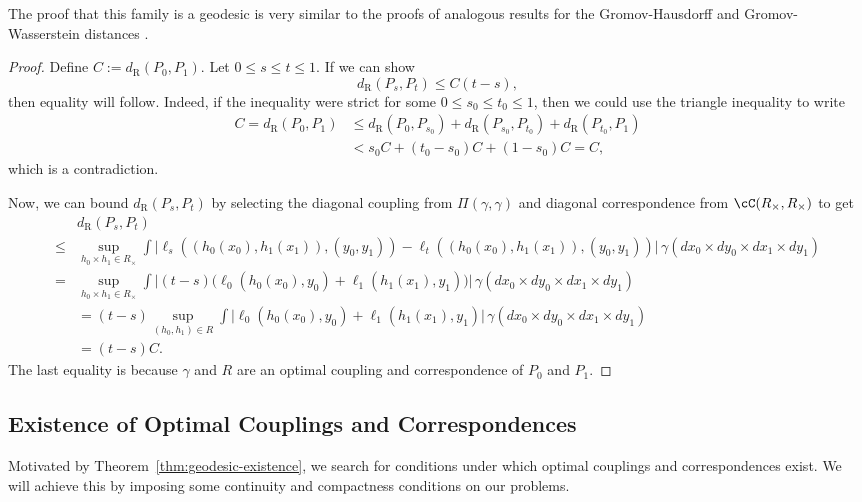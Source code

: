 \documentclass[twoside,11pt]{article}
\newcommand{\dexp}[1][]{d_{\mathrm{R}#1}}
\begin{document}
    The proof that this family is a geodesic is very similar to the proofs of analogous results for the Gromov-Hausdorff and Gromov-Wasserstein distances \citep{chowdhury_explicit_2018,sturm_space_2012}.
    \begin{proof}
        Define $C:= \dexp(P_0,P_1)$. Let $0\leq s\leq t \leq 1$. If we can show
        \[\dexp(P_s,P_t) \leq C(t-s),\]
        then equality will follow. Indeed, if the inequality were strict for some $0\leq s_0 \leq t_0 \leq 1$, then we could use the triangle inequality to write
        \begin{align*}
            C = \dexp(P_0,P_1)
            & \leq 
            \dexp(P_0,P_{s_0}) + \dexp(P_{s_0},P_{t_0}) + \dexp(P_{t_0},P_1)
            \\ & <
            s_0 C + (t_0 - s_0) C + (1-s_0)C = C,
        \end{align*}
        which is a contradiction.

        Now, we can bound $\dexp(P_s,P_t)$ by selecting the diagonal coupling from $\Pi(\gamma,\gamma)$ and diagonal correspondence from $\cC(R_\times,R_\times)$ to get
        \begin{align*}
            & \dexp(P_s,P_t)\\
            \leq &
            \sup_{h_0\times h_1 \in R_\times}
            \int \big| \ell_s((h_0(x_0),h_1(x_1)), (y_0,y_1)) - \ell_t((h_0(x_0),h_1(x_1)), (y_0,y_1))\big | \, \gamma(dx_0{\times} dy_0 {\times} dx_1 {\times}  dy_1)
            \\ = &
            \sup_{h_0\times h_1 \in R_\times}
            \int \big| (t-s)  \big(\ell_0(h_0(x_0),y_0) + \ell_1(h_1(x_1),y_1) \big )\big | \, \gamma(dx_0{\times} dy_0 {\times} dx_1 {\times}  dy_1)
            \\ &
            = (t-s) \sup_{(h_0,h_1) \in R} 
            \int \big|\ell_0(h_0(x_0),y_0) + \ell_1(h_1(x_1),y_1) \big | \, \gamma(dx_0{\times} dy_0 {\times} dx_1 {\times}  dy_1)
            \\ &
            = (t-s) C.
        \end{align*}
        The last equality is because $\gamma$ and $R$ are an optimal coupling and correspondence of $P_0$ and $P_1$.
    \end{proof}

\subsection{Existence of Optimal Couplings and Correspondences}\label{subsec:optimal-couplings}
    Motivated by Theorem~\ref{thm:geodesic-existence}, we search for conditions under which optimal couplings and correspondences exist. We will achieve this by imposing some continuity and compactness conditions on our problems.
    
\end{document}
